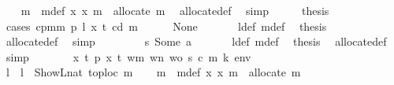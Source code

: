 \begin{isabellebody}
\ \ \isamarkupfalse%
\ m{\isacharprime}{\kern0pt}\ \ m{\isacharprime}{\kern0pt}{\isacharunderscore}{\kern0pt}def{\isacharcolon}{\kern0pt}\ {\isachardoublequoteopen}{\isasymexists}x{\isachardot}{\kern0pt}\ {\isacharparenleft}{\kern0pt}x{\isacharcomma}{\kern0pt}\ m{\isacharprime}{\kern0pt}{\isacharparenright}{\kern0pt}\ {\isacharequal}{\kern0pt}\ allocate\ m{\isachardoublequoteclose}\ \isamarkupfalse%
\ allocate{\isacharunderscore}{\kern0pt}def\ \isamarkupfalse%
\ simp\isanewline
\ \ \isamarkupfalse%
\ \isamarkupfalse%
\ {\isacharquery}{\kern0pt}thesis\isanewline
\ \ \isamarkupfalse%
\ {\isacharparenleft}{\kern0pt}cases\ {\isachardoublequoteopen}cpm{}m\ p\ l\ x\ t\ cd\ m{\isacharprime}{\kern0pt}{\isachardoublequoteclose}{\isacharparenright}{\kern0pt}\isanewline
\ \ \ \ \isamarkupfalse%
\ None\isanewline
\ \ \ \ \isamarkupfalse%
\ {}{}\ l{\isacharunderscore}{\kern0pt}def\ m{\isacharprime}{\kern0pt}{\isacharunderscore}{\kern0pt}def\ \isamarkupfalse%
\ {\isacharquery}{\kern0pt}thesis\ \isamarkupfalse%
\ allocate{\isacharunderscore}{\kern0pt}def\ \isamarkupfalse%
\ simp\isanewline
\ \ \isamarkupfalse%
\isanewline
\ \ \ \ \isamarkupfalse%
\ s{}{\isacharcolon}{\kern0pt}\ {\isacharparenleft}{\kern0pt}Some\ a{\isacharparenright}{\kern0pt}\isanewline
\ \ \ \ \isamarkupfalse%
\ {}{}\ l{\isacharunderscore}{\kern0pt}def\ m{\isacharprime}{\kern0pt}{\isacharunderscore}{\kern0pt}def\ \isamarkupfalse%
\ {\isacharquery}{\kern0pt}thesis\ \isamarkupfalse%
\ allocate{\isacharunderscore}{\kern0pt}def\ \isamarkupfalse%
\ simp\isanewline
\ \ \isamarkupfalse%
\isanewline
{}\isamarkupfalse%
\isanewline
\ \ \isamarkupfalse%
\ {\isacharparenleft}{\kern0pt}{}{}\ x\ t\ p\ x{\isacharprime}{\kern0pt}\ t{\isacharprime}{\kern0pt}\ wm\ wn\ wo\ s\ c\ m\ k\ env{\isacharparenright}{\kern0pt}\isanewline
\ \ \isamarkupfalse%
\ l\ \ {\isachardoublequoteopen}l\ {\isacharequal}{\kern0pt}\ ShowL\isactrlsub n\isactrlsub a\isactrlsub t\ {\isacharparenleft}{\kern0pt}toploc\ m{\isacharparenright}{\kern0pt}{\isachardoublequoteclose}\isanewline
\ \ \isamarkupfalse%
\ m{\isacharprime}{\kern0pt}\ \ m{\isacharprime}{\kern0pt}{\isacharunderscore}{\kern0pt}def{\isacharcolon}{\kern0pt}\ {\isachardoublequoteopen}{\isasymexists}x{\isachardot}{\kern0pt}\ {\isacharparenleft}{\kern0pt}x{\isacharcomma}{\kern0pt}\ m{\isacharprime}{\kern0pt}{\isacharparenright}{\kern0pt}\ {\isacharequal}{\kern0pt}\ allocate\ m{\isachardoublequoteclose}\ \isamarkupfalse%

\end{isabellebody}
